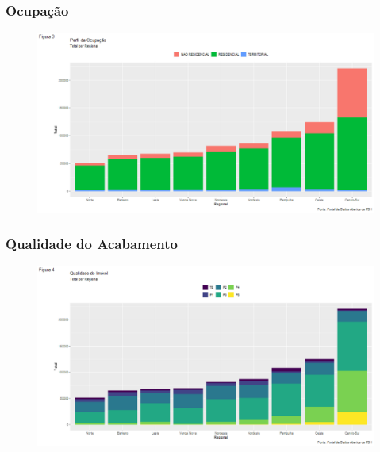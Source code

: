 \begin{frame}

    \frametitle{Ocupação}
    \begin{figure}[!htbp]
                \centering
       	    \includegraphics[scale=0.35]{imagens/ocupacao.png}
            \end{figure}

\end{frame}

\begin{frame}

    \frametitle{Qualidade do Acabamento}
    \begin{figure}[!htbp]
                \centering
       	    \includegraphics[scale=0.35]{imagens/acabamento.png}
            \end{figure}

\end{frame}